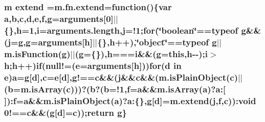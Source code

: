 \hypertarget{root_2static_2root_2js_2jquery-1_811_81_8min_8js_a167947be5252c14d5389d8a01a8c8545}{
\subsubsection[{extend}]{ {\bf m} extend =m.\-fn.\-extend=function()\{var {\bf a},{\bf b},{\bf c},{\bf d},{\bf e},{\bf f},{\bf g}=arguments\mbox{[}0\mbox{]}$\vert$$\vert$\{\},{\bf h}=1,{\bf i}=arguments.\-length,{\bf j}=!1;{\bf for}(\char`\"{}boolean\char`\"{}==typeof {\bf g}\&\&({\bf j}={\bf g},{\bf g}=arguments\mbox{[}{\bf h}\mbox{]}$\vert$$\vert$\{\},{\bf h}++),\char`\"{}object\char`\"{}==typeof {\bf g}$\vert$$\vert$m.\-is\-Function({\bf g})$\vert$$\vert$({\bf g}=\{\}),{\bf h}==={\bf i}\&\&({\bf g}=this,{\bf h}-\/-\/);{\bf i}$>${\bf h};{\bf h}++){\bf if}(null!=({\bf e}=arguments\mbox{[}{\bf h}\mbox{]})){\bf for}({\bf d} in {\bf e}){\bf a}={\bf g}\mbox{[}{\bf d}\mbox{]},{\bf c}={\bf e}\mbox{[}{\bf d}\mbox{]},g!=={\bf c}\&\&({\bf j}\&\&{\bf c}\&\&(m.\-is\-Plain\-Object({\bf c})$\vert$$\vert$({\bf b}=m.\-is\-Array({\bf c})))?({\bf b}?({\bf b}=!1,{\bf f}={\bf a}\&\&m.\-is\-Array({\bf a})?a\-:\mbox{[}$\,$\mbox{]})\-:{\bf f}={\bf a}\&\&m.\-is\-Plain\-Object({\bf a})?a\-:\{\},{\bf g}\mbox{[}{\bf d}\mbox{]}=m.\-extend({\bf j},{\bf f},{\bf c}))\-:void 0!=={\bf c}\&\&({\bf g}\mbox{[}{\bf d}\mbox{]}={\bf c}));return {\bf g}\}}}\label{root_2static_2root_2js_2jquery-1_811_81_8min_8js_a167947be5252c14d5389d8a01a8c8545}
